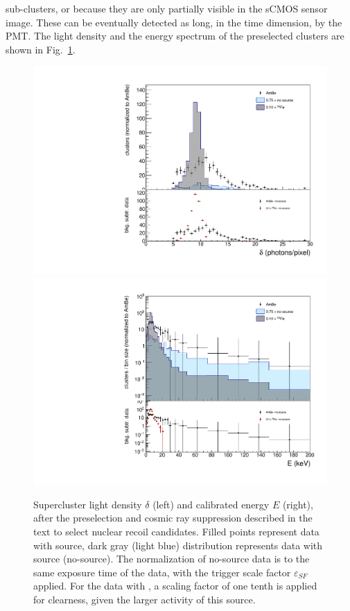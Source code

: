 sub-clusters, or because they are only partially visible in the sCMOS
sensor image. These can be eventually detected as long, in the time
dimension, by the PMT.  The light density and the energy spectrum of
the preselected clusters are shown in Fig.~\ref{fig:presel}.
%
\begin{figure}[ht]
  \begin{center}
  \includegraphics[width=0.45\linewidth]{figures/density_fullSel}
  \includegraphics[width=0.45\linewidth]{figures/energy_fullSel}

  \caption{Supercluster light density $\delta$ (left) and calibrated
    energy $E$ (right), after the preselection and cosmic ray
    suppression described in the text to select nuclear recoil
    candidates. Filled points represent data with \ambe source, dark
    gray (light blue) distribution represents data with \fe source
    (no-source).  The normalization of no-source data is to the same
    exposure time of the \ambe data, with the trigger scale factor
    $\varepsilon_{SF}$ applied. For the data with \fe, a scaling
    factor of one tenth is applied for clearness, given the larger
    activity of this source.  \label{fig:presel}}

  \end{center}
\end{figure}


